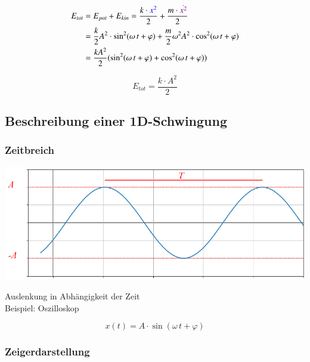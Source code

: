 \begin{align*}
E_{tot} &= E_{pot} + E_{kin} = \frac{k \cdot \textcolor{blue}{x^2} }{2} + \frac{m \cdot \textcolor{violet}{\dot{x^2} } }{2}   \\
&= \frac{k}{2} A^2 \cdot \sin^2(\omega \, t + \varphi) + \frac{m}{2} \omega^2  A^2 \cdot \cos^2(\omega \, t + \varphi) \\
&= \frac{k A^2}{2} ( \sin^2(\omega \, t + \varphi) + \cos^2(\omega \, t + \varphi) )
\end{align*}


$$ \boxed{ E_{tot} = \frac{k \cdot A^2}{2}  } $$






\subsection{Beschreibung einer 1D-Schwingung}

\subsubsection{Zeitbreich}

\begin{minipage}{0.38\linewidth}
\includegraphics[width=0.9\linewidth]{Bilder/Wellen-Optik/zeitbereich}
\end{minipage}
\hfill
\begin{minipage}{0.58\linewidth}
Auslenkung in Abhängigkeit der Zeit \\
Beispiel: Oszilloskop 

$$ x(t) = A \cdot \sin(\omega \, t + \varphi) $$
\end{minipage}


\subsubsection{Zeigerdarstellung}

